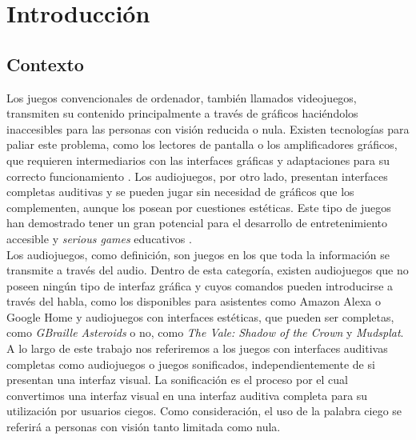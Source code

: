 \chapter{Introducción}
\section{Contexto}

 Los juegos convencionales de ordenador, también llamados videojuegos, transmiten su contenido principalmente a través de gráficos haciéndolos inaccesibles para las personas con visión reducida o nula. Existen tecnologías para paliar este problema, como los lectores de pantalla o los amplificadores gráficos, que requieren intermediarios con las interfaces gráficas y adaptaciones para su correcto funcionamiento \cite[p ~482]{evans_screen_2008} \cite{accesskit_accesskit_nodate}. Los audiojuegos, por otro lado, presentan interfaces completas auditivas y se pueden jugar sin necesidad de gráficos que los complementen, aunque los posean por cuestiones estéticas. Este tipo de juegos han demostrado tener un gran potencial para el desarrollo de entretenimiento accesible  \cite{andradePlayingBlindRevealing2019} y \textit{serious games} educativos \cite{cabrera-solanoUseAudiogamesStrategic2020}.\\
 
  Los audiojuegos, como definición, son juegos en los que toda la información se transmite a través del audio. Dentro de esta categoría, existen audiojuegos que no poseen ningún tipo de interfaz gráfica y cuyos comandos pueden introducirse a través del habla, como los disponibles para asistentes como Amazon Alexa o Google Home \cite[p ~ 14]{allisonDesignPatternsVoice2018} y audiojuegos con interfaces estéticas, que pueden ser completas, como \textit{GBraille Asteroids}\cite[p ~234]{araujoDesignUsabilityBraillebased2016} o no, como \textit{The Vale: Shadow of the Crown} \cite{noauthor_vale_nodate} y \textit{Mudsplat}\cite{audiogamesNewPerspectives}. \\
  
A lo largo de este trabajo nos referiremos a los juegos con interfaces auditivas completas como audiojuegos o juegos sonificados, independientemente de si presentan una interfaz visual. La sonificación es el proceso por el cual convertimos una interfaz visual en una interfaz auditiva completa para su utilización por usuarios ciegos. Como consideración, el uso de la palabra ciego se referirá a personas con visión tanto limitada como nula.\\

